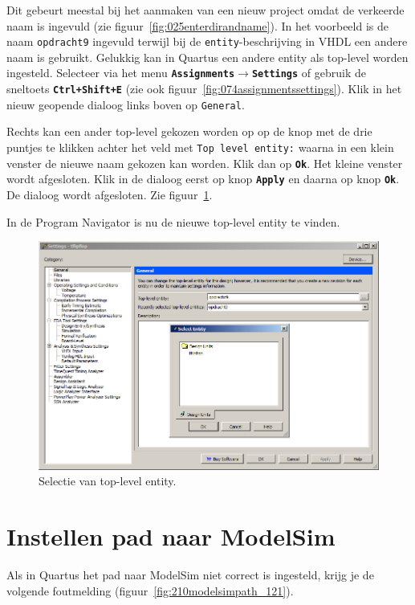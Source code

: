 \documentclass[a4paper,12pt,fleqn,twoside]{book}
\def\tutpicscale{0.455}
\newcommand{\menu}[1]{\texttt{\textbf{#1}}}
\newcommand{\knop}[1]{\texttt{\textbf{#1}}}
\newcommand{\naam}[1]{\texttt{#1}}
\def\pijl{$\rightarrow$}%
\begin{document}
Dit gebeurt meestal bij het aanmaken van een nieuw project omdat de verkeerde
naam is ingevuld (zie figuur~\ref{fig:025enterdirandname}). In het voorbeeld is
de naam \naam{opdracht9} ingevuld terwijl bij de \naam{entity}-beschrijving in
VHDL een andere naam is gebruikt. Gelukkig kan in Quartus een andere entity
als top-level worden ingesteld. Selecteer via het menu
\menu{Assignments\pijl{}Settings} of gebruik de sneltoets \menu{Ctrl+Shift+E}
(zie ook figuur~\ref{fig:074assignmentssettings}). Klik in het nieuw geopende dialoog
links boven op \naam{General}.

Rechts kan een ander top-level gekozen worden op op de knop met de drie puntjes
te klikken achter het veld met \naam{Top level entity:} waarna in een klein venster
de nieuwe naam gekozen kan worden. Klik dan op \knop{Ok}. Het kleine venster wordt
afgesloten. Klik in de dialoog eerst op knop \knop{Apply} en daarna op knop \knop{Ok}.
De dialoog wordt afgesloten. Zie figuur~\ref{fig:222selecttoplevelentity}.

In de Program Navigator is nu de nieuwe top-level entity te vinden.

\begin{figure}[H]
\centering
\includegraphics[scale=\tutpicscale]{222selecttoplevelentity.png}
\caption{Selectie van top-level entity.}
\label{fig:222selecttoplevelentity}
\end{figure}


\section{Instellen pad naar ModelSim}
\label{chap:instellenmodelsimpad}
Als in Quartus het pad naar ModelSim niet correct is ingesteld, krijg je de volgende foutmelding 
(figuur~\ref{fig:210modelsimpath_121}).
\end{document}
